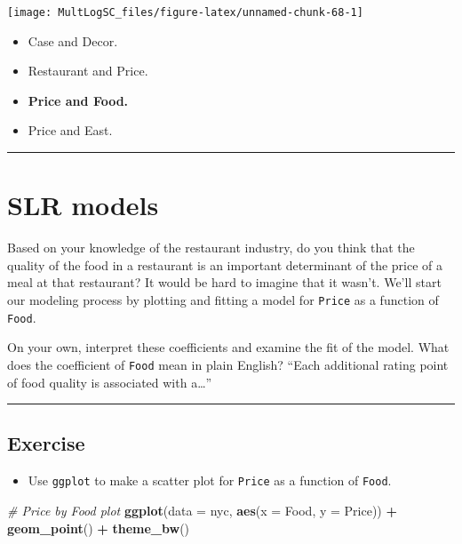 \documentclass[]{book}
\newenvironment{Shaded}{\begin{snugshade}}{\end{snugshade}}
\newcommand{\KeywordTok}[1]{\textcolor[rgb]{0.13,0.29,0.53}{\textbf{#1}}}
\newcommand{\DataTypeTok}[1]{\textcolor[rgb]{0.13,0.29,0.53}{#1}}
\newcommand{\StringTok}[1]{\textcolor[rgb]{0.31,0.60,0.02}{#1}}
\newcommand{\CommentTok}[1]{\textcolor[rgb]{0.56,0.35,0.01}{\textit{#1}}}
\newcommand{\OperatorTok}[1]{\textcolor[rgb]{0.81,0.36,0.00}{\textbf{#1}}}
\newcommand{\NormalTok}[1]{#1}
\providecommand{\tightlist}{%
  \setlength{\itemsep}{0pt}\setlength{\parskip}{0pt}}
\begin{document}
\begin{center}\texttt{[image: MultLogSC\_files/figure-latex/unnamed-chunk-68-1]} \end{center}

\begin{itemize}
\item
  Case and Decor.
\item
  Restaurant and Price.
\item
  \textbf{Price and Food.}
\item
  Price and East.
\end{itemize}

\begin{center}\rule{0.5\linewidth}{\linethickness}\end{center}

\section{SLR models}\label{slr-models}

Based on your knowledge of the restaurant industry, do you think that
the quality of the food in a restaurant is an important determinant of
the price of a meal at that restaurant? It would be hard to imagine that
it wasn't. We'll start our modeling process by plotting and fitting a
model for \texttt{Price} as a function of \texttt{Food}.

On your own, interpret these coefficients and examine the fit of the
model. What does the coefficient of \texttt{Food} mean in plain English?
``Each additional rating point of food quality is associated with
a\ldots{}''

\begin{center}\rule{0.5\linewidth}{\linethickness}\end{center}

\subsection*{Exercise}\label{exercise-21}

\begin{itemize}
\tightlist
\item
  Use \texttt{ggplot} to make a scatter plot for \texttt{Price} as a
  function of \texttt{Food}.
\end{itemize}

\begin{Shaded}
\begin{Highlighting}[]
\CommentTok{# Price by Food plot}
\KeywordTok{ggplot}\NormalTok{(}\DataTypeTok{data =}\NormalTok{ nyc, }\KeywordTok{aes}\NormalTok{(}\DataTypeTok{x =}\NormalTok{ Food, }\DataTypeTok{y =}\NormalTok{ Price)) }\OperatorTok{+}\StringTok{ }
\StringTok{  }\KeywordTok{geom_point}\NormalTok{() }\OperatorTok{+}\StringTok{ }
\StringTok{  }\KeywordTok{theme_bw}\NormalTok{()}
\end{Highlighting}
\end{Shaded}
\end{document}
